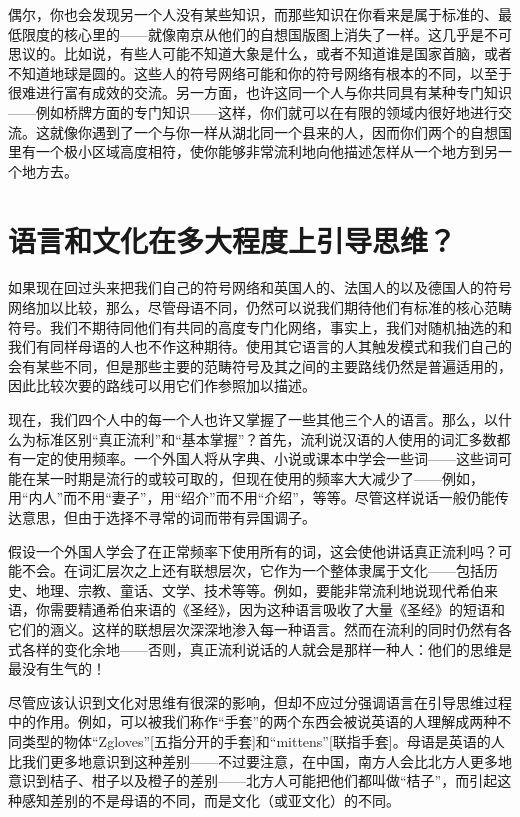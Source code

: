 偶尔，你也会发现另一个人没有某些知识，而那些知识在你看来是属于标准的、最低限度的核心里的——就像南京从他们的自想国版图上消失了一样。这几乎是不可思议的。比如说，有些人可能不知道大象是什么，或者不知道谁是国家首脑，或者不知道地球是圆的。这些人的符号网络可能和你的符号网络有根本的不同，以至于很难进行富有成效的交流。另一方面，也许这同一个人与你共同具有某种专门知识——例如桥牌方面的专门知识——这样，你们就可以在有限的领域内很好地进行交流。这就像你遇到了一个与你一样从湖北同一个县来的人，因而你们两个的自想国里有一个极小区域高度相符，使你能够非常流利地向他描述怎样从一个地方到另一个地方去。

\section{语言和文化在多大程度上引导思维？}

如果现在回过头来把我们自己的符号网络和英国人的、法国人的以及德国人的符号网络加以比较，那么，尽管母语不同，仍然可以说我们期待他们有标准的核心范畴符号。我们不期待同他们有共同的高度专门化网络，事实上，我们对随机抽选的和我们有同样母语的人也不作这种期待。使用其它语言的人其触发模式和我们自己的会有某些不同，但是那些主要的范畴符号及其之间的主要路线仍然是普遍适用的，因此比较次要的路线可以用它们作参照加以描述。

现在，我们四个人中的每一个人也许又掌握了一些其他三个人的语言。那么，以什么为标准区别“真正流利”和“基本掌握”？首先，流利说汉语的人使用的词汇多数都有一定的使用频率。一个外国人将从字典、小说或课本中学会一些词——这些词可能在某一时期是流行的或较可取的，但现在使用的频率大大减少了——例如，用“内人”而不用“妻子”，用“绍介”而不用“介绍”，等等。尽管这样说话一般仍能传达意思，但由于选择不寻常的词而带有异国调子。

假设一个外国人学会了在正常频率下使用所有的词，这会使他讲话真正流利吗？可能不会。在词汇层次之上还有联想层次，它作为一个整体隶属于文化——包括历史、地理、宗教、童话、文学、技术等等。例如，要能非常流利地说现代希伯来语，你需要精通希伯来语的《圣经》，因为这种语言吸收了大量《圣经》的短语和它们的涵义。这样的联想层次深深地渗入每一种语言。然而在流利的同时仍然有各式各样的变化余地——否则，真正流利说话的人就会是那样一种人：他们的思维是最没有生气的！

尽管应该认识到文化对思维有很深的影响，但却不应过分强调语言在引导思维过程中的作用。例如，可以被我们称作“手套”的两个东西会被说英语的人理解成两种不同类型的物体“Zgloves”[五指分开的手套]和“mittens”[联指手套]。母语是英语的人比我们更多地意识到这种差别——不过要注意，在中国，南方人会比北方人更多地意识到桔子、柑子以及橙子的差别——北方人可能把他们都叫做“桔子”，而引起这种感知差别的不是母语的不同，而是文化（或亚文化）的不同。

